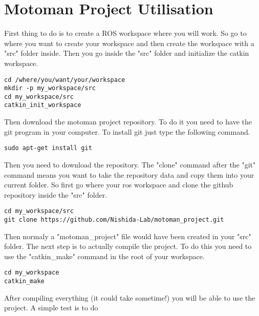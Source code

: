 \section{Motoman Project Utilisation}
First thing to do is to create a ROS workspace where you will work.  So go to where you want to create your workspace and then create the workspace with a "src" folder inside. Then you go inside the "src" folder and initialize the catkin workspace.

\begin{lstlisting}
cd /where/you/want/your/workspace
mkdir -p my_workspace/src
cd my_workspace/src
catkin_init_workspace
\end{lstlisting}

Then download the motoman project repository. To do it you need to have the git program in your computer. To install git just type the following command.

\begin{lstlisting}
sudo apt-get install git
\end{lstlisting}

Then you need to download the repository. The "clone" command after the "git" command means you want to take the repository data and copy them into your current folder. So first go where your ros workspace and clone the github repository inside the "src" folder.  

\begin{lstlisting}
cd my_workspace/src
git clone https://github.com/Nishida-Lab/motoman_project.git
\end{lstlisting}

Then normaly a "motoman\_project" file would have been created in your "src" folder. The next step is to actually compile the project. To do this you need to use the "catkin\_make" command in the root of your workspace.


\begin{lstlisting}
cd my_workspace
catkin_make
\end{lstlisting}

After compiling everything (it could take sometime!) you will be able to use the project. A simple test is to do 